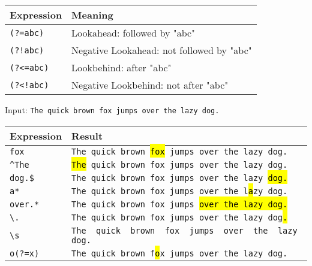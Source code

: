 \documentclass[a4paper,10pt]{article}
\begin{document}
\begin{multicols}{2}
    \begin{tcolorbox}[colback=white, colframe=black, title=Extended Features]
        \renewcommand{\arraystretch}{1.3}
        \begin{tabular}{p{2cm}p{5cm}}
            \hline
            \textbf{Expression} & \textbf{Meaning}                          \\
            \hline
            \texttt{(?=abc)}  & Lookahead: followed by "abc"                \\
            \texttt{(?!abc)}  & Negative Lookahead: not followed by "abc" \\
            \texttt{(?<=abc)} & Lookbehind: after "abc"                      \\
            \texttt{(?<!abc)} & Negative Lookbehind: not after "abc"       \\
        \end{tabular}
    \end{tcolorbox}

    \begin{tcolorbox}[colback=white, colframe=black, title=Examples]
        Input: \texttt{The quick brown fox jumps over the lazy dog.} \\[5mm]
        \begin{tabular}{p{2cm}p{5cm}}
            \hline
            \textbf{Expression} & \textbf{Result} \\
            \hline
            \texttt{fox} & \texttt{The quick brown \hl{fox} jumps over the lazy dog.} \\
            \texttt{\textasciicircum The} & \texttt{\hl{The} quick brown fox jumps over the lazy dog.} \\
            \texttt{dog.\$} & \texttt{The quick brown fox jumps over the lazy \hl{dog.}} \\
            \texttt{a*} & \texttt{The quick brown fox jumps over the l\hl{a}zy dog.} \\
            \texttt{over.*} & \texttt{The quick brown fox jumps \hl{over the lazy dog.}} \\
            \texttt{\textbackslash .} & \texttt{The quick brown fox jumps over the lazy dog\hl{.}} \\
            \texttt{\textbackslash s} & \texttt{The\hl{ }quick\hl{ }brown\hl{ }fox\hl{ }jumps\hl{ }over\hl{ }the\hl{ }lazy\hl{ }dog.} \\
            \texttt{o(?=x)} & \texttt{The quick brown f\hl{o}x jumps over the lazy dog.} \\
        \end{tabular}
    \end{tcolorbox}

\end{multicols}
\end{document}
